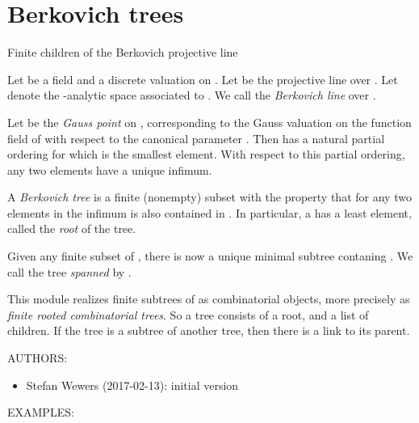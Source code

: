 \documentclass[letterpaper,10pt,english]{sphinxmanual}
\begin{document}
\section{Berkovich trees}
\label{berkovich_trees:berkovich-trees}\label{berkovich_trees::doc}\label{berkovich_trees:module-mclf.berkovich.berkovich_trees}
Finite children of the Berkovich projective line

Let  be a field and  a discrete valuation on . Let 
be the projective line over . Let  denote the
-analytic space associated to . We call  the \emph{Berkovich
line} over .

Let  be the \emph{Gauss point} on , corresponding to the Gauss
valuation on the function field of  with respect to the canonical parameter
. Then  has a natural partial ordering for which  is the
smallest element. With respect to this partial ordering, any two elements have
a unique infimum.

A \emph{Berkovich tree} is a finite (nonempty) subset  with the
property that for any two elements in  the infimum is also contained in
. In particular, a  has a least element, called the \emph{root} of the tree.

Given any finite subset  of , there is now a unique minimal
subtree  contaning . We call  the tree \emph{spanned} by .

This module realizes finite subtrees of  as combinatorial objects,
more precisely as \emph{finite rooted combinatorial trees}. So a tree consists
of a root, and a list of children. If the tree is a subtree of another tree,
then there is a link to its parent.

AUTHORS:
\begin{itemize}
\item {} 
Stefan Wewers (2017-02-13): initial version

\end{itemize}

EXAMPLES:
\end{document}
